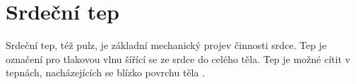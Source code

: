 \chapter{Srdeční tep}

Srdeční tep, též pulz, je základní mechanický projev činnosti srdce.
Tep je označení pro tlakovou vlnu šířící se ze srdce do celého těla.
Tep je možné cítit v tepnách, nacházejících se blízko povrchu těla \cite{ucebniceFyziologie}.